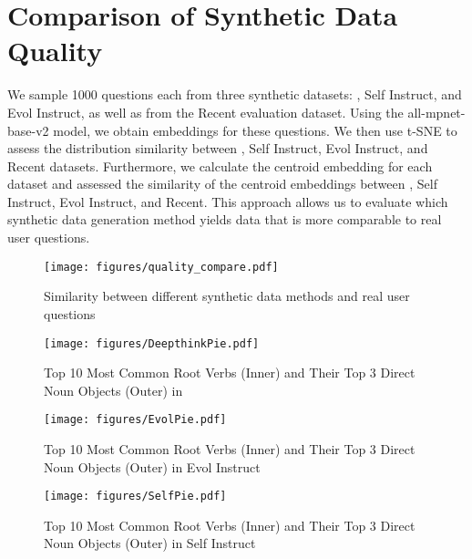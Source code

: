 \section{Comparison of Synthetic Data Quality}
We sample 1000 questions each from three synthetic datasets: \ourmodel, Self Instruct, and Evol Instruct, as well as from the Recent evaluation dataset. Using the all-mpnet-base-v2 model, we obtain embeddings for these questions. We then use t-SNE to assess the distribution similarity between \ourmodel, Self Instruct, Evol Instruct, and Recent datasets. Furthermore, we calculate the centroid embedding for each dataset and assessed the similarity of the centroid embeddings between \ourmodel, Self Instruct, Evol Instruct, and Recent. This approach allows us to evaluate which synthetic data generation method yields data that is more comparable to real user questions.

\begin{figure}[htbp]
\centering
\texttt{[image: figures/quality\_compare.pdf]}
    \caption{Similarity between different synthetic data methods and real user questions}
    \label{fig:qualComp}
\end{figure}

\begin{figure}[htbp]
\centering
\texttt{[image: figures/DeepthinkPie.pdf]}
    \caption{Top 10 Most Common Root Verbs (Inner) and Their Top 3 Direct Noun Objects (Outer) in \ourmodel}
    \label{fig:deepthinkPie}
\end{figure}

\begin{figure}[htbp]
\centering
\texttt{[image: figures/EvolPie.pdf]}
    \caption{Top 10 Most Common Root Verbs (Inner) and Their Top 3 Direct Noun Objects (Outer) in Evol Instruct}
    \label{fig:evolPie}
\end{figure}

\begin{figure}[htbp]
\centering
\texttt{[image: figures/SelfPie.pdf]}
    \caption{Top 10 Most Common Root Verbs (Inner) and Their Top 3 Direct Noun Objects (Outer) in Self Instruct}
    \label{fig:selfPie}
\end{figure}


